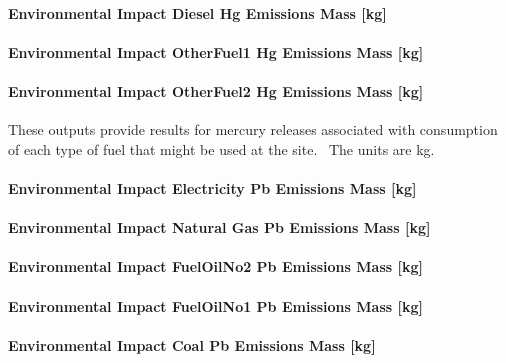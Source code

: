 \paragraph{Environmental Impact Diesel Hg Emissions Mass {[}kg{]}}\label{environmental-impact-diesel-hg-emissions-mass-kg}

\paragraph{Environmental Impact OtherFuel1 Hg Emissions Mass {[}kg{]}}\label{environmental-impact-otherfuel1-hg-emissions-mass-kg}

\paragraph{Environmental Impact OtherFuel2 Hg Emissions Mass {[}kg{]}}\label{environmental-impact-otherfuel2-hg-emissions-mass-kg}

These outputs provide results for mercury releases associated with consumption of each type of fuel that might be used at the site.~ The units are kg.

\paragraph{Environmental Impact Electricity Pb Emissions Mass {[}kg{]}}\label{environmental-impact-electricity-pb-emissions-mass-kg}

\paragraph{Environmental Impact Natural Gas Pb Emissions Mass {[}kg{]}}\label{environmental-impact-natural-gas-pb-emissions-mass-kg}

\paragraph{Environmental Impact FuelOilNo2 Pb Emissions Mass {[}kg{]}}\label{environmental-impact-fuel-oil-2-pb-emissions-mass-kg}

\paragraph{Environmental Impact FuelOilNo1 Pb Emissions Mass {[}kg{]}}\label{environmental-impact-fuel-oil-1-pb-emissions-mass-kg}

\paragraph{Environmental Impact Coal Pb Emissions Mass {[}kg{]}}\label{environmental-impact-coal-pb-emissions-mass-kg}

